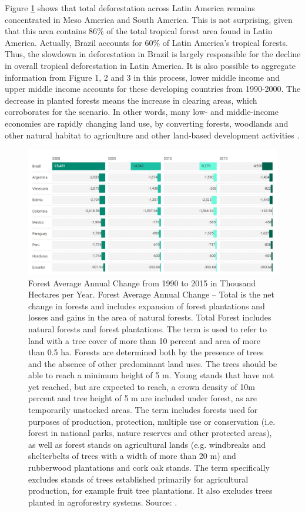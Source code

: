 Figure \ref{intro-fig:3} shows that total deforestation across Latin America remains concentrated
in Meso America and South America. This is not surprising, given that this area contains 86\% of the total tropical forest area found in Latin America. Actually, Brazil accounts for 60\% of Latin America’s tropical forests. Thus, the slowdown in deforestation in Brazil is largely responsible for the decline in overall tropical deforestation in Latin America. It is also possible to aggregate information from Figure 1, 2 and 3 in this process, lower middle income and upper middle income accounts for these developing countries from 1990-2000. The decrease in
planted forests means the increase in clearing areas, which corroborates for the scenario.
In other words, many low- and middle-income economies are rapidly changing land use, by converting forests, woodlands and other natural habitat to agriculture and other land-based development activities \citep{BARBIER2}.

\begin{figure}[H]
\centering
\includegraphics[width=1\linewidth]{Introduction/forestchange_latinamerica.png}
\caption[Forest Average Annual Change from 1990 to 2015 in Thousand Hectares per Year.]{Forest Average Annual Change from 1990 to 2015 in Thousand Hectares per Year. Forest Average Annual Change – Total is the net change in forests and includes expansion of forest plantations and losses and gains in the area of natural forests. Total Forest includes natural forests and forest plantations. The term is used to refer to land with a tree cover of more than 10 percent and area of more than 0.5 ha. Forests are determined both by the presence of trees and the absence of other predominant land uses. The trees should be able to reach a minimum height of 5 m. Young stands that have not yet reached, but are expected to reach, a crown density of 10m percent and tree height of 5 m are included under forest, as are temporarily unstocked areas. The term includes forests used for purposes of production, protection, multiple use or conservation (i.e. forest in national parks, nature reserves and other protected areas), as well as forest stands on agricultural lands (e.g. windbreaks and shelterbelts of trees with a width of more than 20 m) and rubberwood plantations and cork oak stands. The term specifically excludes stands of trees established primarily for agricultural production, for example fruit tree plantations. It also excludes trees planted in agroforestry systems. Source: \citep{unep_2018}.}
\label{intro-fig:3}
\end{figure}

